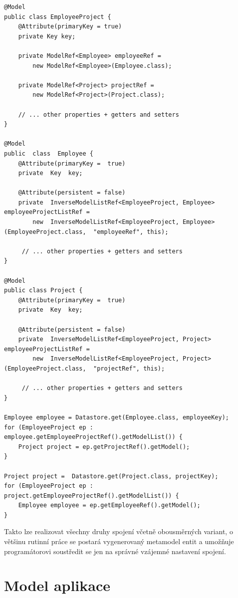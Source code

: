 \begin{lstlisting}[caption={Ukázka many-to-many vztahu s použitím spojovací entitní třídy},label=lst:manyToManyJoinTable,belowcaptionskip=0.4cm]
@Model
public class EmployeeProject {
	@Attribute(primaryKey = true)
	private Key key;

	private ModelRef<Employee> employeeRef = 
		new ModelRef<Employee>(Employee.class);

	private ModelRef<Project> projectRef = 
		new ModelRef<Project>(Project.class);

	// ... other properties + getters and setters
}

@Model
public  class  Employee {
	@Attribute(primaryKey =  true)
	private  Key  key;

	@Attribute(persistent = false)
	private  InverseModelListRef<EmployeeProject, Employee>  employeeProjectListRef =
		new  InverseModelListRef<EmployeeProject, Employee>(EmployeeProject.class,  "employeeRef", this);

     // ... other properties + getters and setters
}

@Model
public class Project {
	@Attribute(primaryKey =  true)
	private  Key  key;

	@Attribute(persistent = false)
	private  InverseModelListRef<EmployeeProject, Project>  employeeProjectListRef =
		new  InverseModelListRef<EmployeeProject, Project>(EmployeeProject.class,  "projectRef", this);

     // ... other properties + getters and setters
}

Employee employee = Datastore.get(Employee.class, employeeKey);
for (EmployeeProject ep : employee.getEmployeeProjectRef().getModelList()) {
	Project project = ep.getProjectRef().getModel();
}

Project project =  Datastore.get(Project.class, projectKey);
for (EmployeeProject ep : project.getEmployeeProjectRef().getModelList()) {
	Employee employee = ep.getEmployeeRef().getModel();
}
\end{lstlisting}

Takto lze realizovat všechny druhy spojení včetně obousměrných variant, o většinu rutinní práce se postará vygenerovaný metamodel entit a umožňuje programátorovi soustředit se jen na správné vzájemné nastavení spojení.

\section{Model aplikace}

